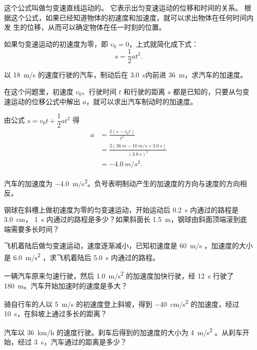 这个公式叫做匀变速直线运动的。
它表示出匀变速运动的位移和时间的关系。
根据这个公式，如果已经知道物体的初速度和加速度，就可以求出物体在任何时间内发
生的位移，从而可以确定物体在任一时刻的位置。

如果匀变速运动的初速度为零，即 $v_0=0$，上式就简化成下式：
\[s=\frac{1}{2}at^2.\]

\begin{example}
以 \qty{18}{m/s} 的速度行驶的汽车，制动后在 \qty{3.0}{s}内前进 \qty{36}{m}，求汽车的加速度。
\end{example}

\begin{solution}
在这个问题里，初速度 $v_0$、行驶时间 $t$ 和行驶的距离 $s$ 都是已知的，只要从匀变速运动的位移公式中解出 $a$，就可以求出汽车制动时的加速度。

由公式 $s=v_0t+\dfrac{1}{2}at^2$ 得
\[\begin{split}
a&=\frac{2(s-v_0t)}{t^2}\\
&=\frac{2(\qty{36}{m}-\qty{18}{m/s}\times \qty{3.0}{s})}{(\qty{3.0}{s})^2}\\
&= \qty{-4.0}{m/s^2}. 
\end{split} \]

汽车的加速度为 \qty{-4.0}{m/s^2}。负号表明制动产生的加速度的方向与速度的方向相反。
\end{solution}

\begin{Practice}
\begin{question}
\item 钢球在斜槽上做初速度为零的匀变速运动，开始运动后 \qty{0.2}{s} 内通过的路程是 \qty{3.0}{cm}， \qty{1}{s} 内通过的路程是多少？如果斜面长 \qty{1.5}{m}，钢球由斜面顶端滚到底端需要多长时间？
\item 飞机着陆后做匀变速运动，速度逐渐减小，已知初速度是 \qty{60}{m/s} ，加速度的大小是 \qty{6.0}{m/s^2} ，求飞机着陆后 \qty{5.0}{s} 内通过的路程。
\item 一辆汽车原来匀速行驶，然后 \qty{1.0}{m/s^2} 的加速度加快行驶，经 \qty{12}{s} 行驶了 \qty{180}{m}。汽车开始加速时的速度是多大？
\item 骑自行车的人以 \qty{5}{m/s} 的初速度登上斜坡，得到 \qty{-40}{cm/s^2} 的加速度，经过 \qty{10}{s}，在斜坡上通过多长的距离？
\item 汽车以 \qty{36}{km/h} 的速度行驶。刹车后得到的加速度的大小为 \qty{4}{m/s^2} 。从刹车开始，经过 \qty{3}{s}，汽车通过的距离是多少？
\end{question}
\end{Practice}


